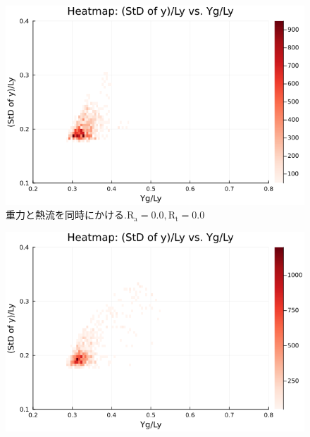 

\begin{figure}[H]
  \centering
  \includegraphics[scale=0.6]{image/RaRtmap_heat/2023-11-14T18:19:29.358__chi1.265_Ay50_rho0.4_T0.43_dT0.04_Rd0.0_Rt0.0_Ra0.0_g0.0003999718779659611_run4.0e7_output.png}
  \caption{$重力と熱流を同時にかける. \text{R}_\text{a}=0.0,\text{R}_\text{t}=0.0$}
\end{figure}

\begin{figure}[H]
  \centering
  \includegraphics[scale=0.6]{image/RaRtmap_heat/2023-11-14T19:14:52.710__chi1.265_Ay50_rho0.4_T0.43_dT0.04_Rd0.0_Rt0.0_Ra0.4693845_g0.0003999718779659611_run4.0e7_output.png}
  \label{}
\end{figure}

